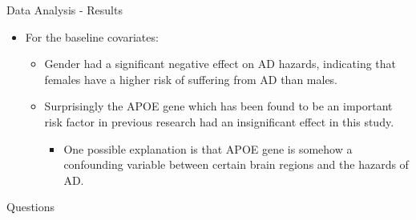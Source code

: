 \documentclass[
  ignorenonframetext,
]{beamer}
\providecommand{\tightlist}{%
  \setlength{\itemsep}{0pt}\setlength{\parskip}{0pt}}
\begin{document}
\begin{frame}{Data Analysis - Results}
\protect\hypertarget{data-analysis---results-1}{}
\begin{itemize}
\tightlist
\item
  For the baseline covariates:

  \begin{itemize}
  \tightlist
  \item
    Gender had a significant negative effect on AD hazards, indicating
    that females have a higher risk of suffering from AD than males.
  \item
    Surprisingly the APOE gene which has been found to be an important
    risk factor in previous research had an insignificant effect in this
    study.

    \begin{itemize}
    \tightlist
    \item
      One possible explanation is that APOE gene is somehow a
      confounding variable between certain brain regions and the hazards
      of AD.
    \end{itemize}
  \end{itemize}
\end{itemize}
\end{frame}

\begin{frame}{Questions}
\protect\hypertarget{questions}{}
\end{frame}
\end{document}
